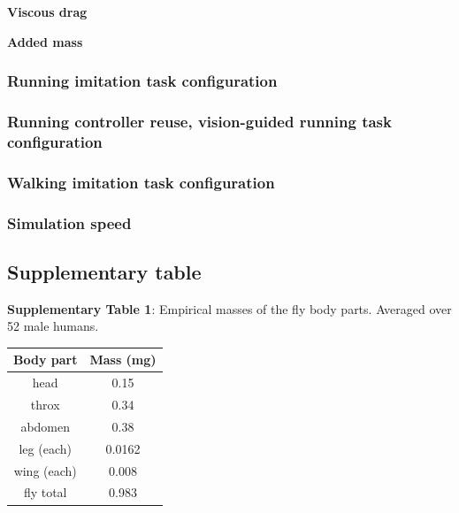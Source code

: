 \documentclass[sn-mathphys-num]{sn-jnl}%
\theoremstyle{thmstyleone}%
\theoremstyle{thmstyletwo}%
\theoremstyle{thmstylethree}%
\begin{document}
\begin{appendices}
\textbf{Viscous drag}


\textbf{Added mass}


\subsubsection{Running imitation task configuration}

\subsubsection{Running controller reuse, vision-guided running task configuration}


\subsubsection{Walking imitation task configuration}


\subsubsection{Simulation speed}





\subsection{Supplementary table}\label{secA1}




\textbf{Supplementary Table 1}: Empirical masses of the fly body parts. 
Averaged over 52 male humans.

\begin{table}[htbp]
	\centering
	\small
	\begin{tabular}{cc}
		\toprule
		Body part         &        Mass (mg)     \\
		\midrule
		head      &   0.15      \\
		throx      &   0.34      \\
		abdomen      &   0.38      \\
		leg (each)      &   0.0162      \\
		wing (each)      &   0.008      \\
		\midrule
		fly total      &   0.983      \\
		

\end{tabular}
\end{table}
\end{appendices}
\end{document}
